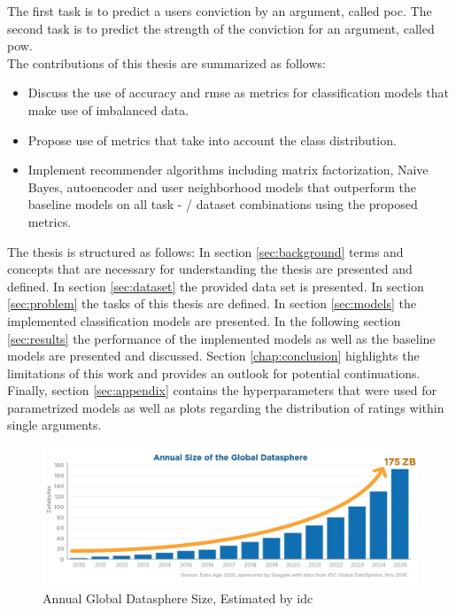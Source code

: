 The first task is to predict a users conviction by an argument, called \acrfull{poc}. The second task is to predict the strength of the conviction for an argument, called \acrfull{pow}.\\
The contributions of this thesis are summarized as follows:
\begin{itemize}
    \item Discuss the use of accuracy and \acrshort{rmse} as metrics for classification models that make use of imbalanced data.
    \item Propose use of metrics that take into account the class distribution.
    \item Implement recommender algorithms including matrix factorization, Naive Bayes, autoencoder and user neighborhood models that outperform the baseline models on all task - / dataset combinations using the proposed metrics.
 \end{itemize}
The thesis is structured as follows: In section \ref{sec:background} terms and concepts that are necessary for understanding the thesis are presented and defined. In section \ref{sec:dataset} the provided data set is presented. In section \ref{sec:problem} the tasks of this thesis are defined. In section \ref{sec:models} the implemented classification models are presented. In the following section \ref{sec:results} the performance of the implemented models as well as the baseline models are presented and discussed. Section \ref{chap:conclusion} highlights the limitations of this work and provides an outlook for potential continuations. Finally, section \ref{sec:appendix} contains the hyperparameters that were used for parametrized models as well as plots regarding the distribution of ratings within single arguments.

\begin{figure}[t]
    \centering
    \includegraphics[width=1\textwidth]{images/annual_datasphere_growth.jpg}
    \caption{Annual Global Datasphere Size, Estimated by \acrshort{idc}}
    \label{fig:datasphere_growth}
\end{figure}

